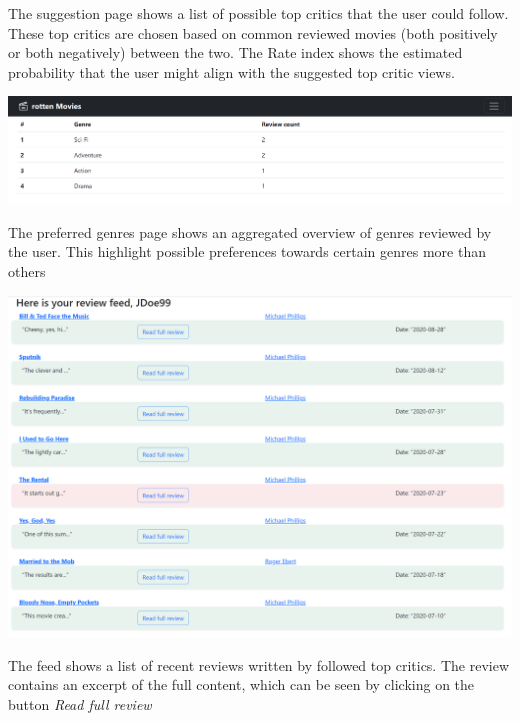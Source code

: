 The suggestion page shows a list of possible top critics that the user could follow. These top critics are chosen based on common reviewed movies (both positively or both negatively) between the two. The Rate index shows the estimated probability that the user might align with the suggested top critic views.

\includegraphics[scale=0.45]{../../../images/user_manual/preferred_genres.png}
 
The preferred genres page shows an aggregated overview of genres reviewed by the user. This highlight possible preferences towards certain genres more than others

\includegraphics[scale=0.45]{../../../images/user_manual/feed.png} 

The feed shows a list of recent reviews written by followed top critics. The review contains an excerpt of the full content, which can be seen by clicking on the button \textit{Read full review}

